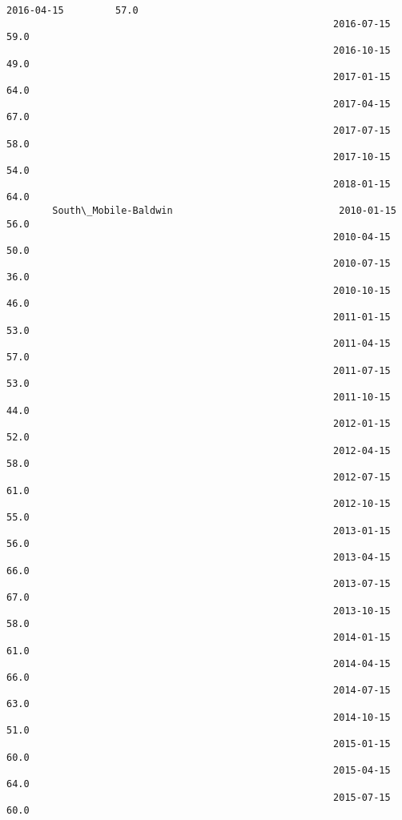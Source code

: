 \documentclass[11pt]{article}
\begin{document}
\begin{Verbatim}[commandchars=\\\{\}]
                                                         2016-04-15         57.0   
                                                         2016-07-15         59.0   
                                                         2016-10-15         49.0   
                                                         2017-01-15         64.0   
                                                         2017-04-15         67.0   
                                                         2017-07-15         58.0   
                                                         2017-10-15         54.0   
                                                         2018-01-15         64.0   
        South\_Mobile-Baldwin                             2010-01-15         56.0   
                                                         2010-04-15         50.0   
                                                         2010-07-15         36.0   
                                                         2010-10-15         46.0   
                                                         2011-01-15         53.0   
                                                         2011-04-15         57.0   
                                                         2011-07-15         53.0   
                                                         2011-10-15         44.0   
                                                         2012-01-15         52.0   
                                                         2012-04-15         58.0   
                                                         2012-07-15         61.0   
                                                         2012-10-15         55.0   
                                                         2013-01-15         56.0   
                                                         2013-04-15         66.0   
                                                         2013-07-15         67.0   
                                                         2013-10-15         58.0   
                                                         2014-01-15         61.0   
                                                         2014-04-15         66.0   
                                                         2014-07-15         63.0   
                                                         2014-10-15         51.0   
                                                         2015-01-15         60.0   
                                                         2015-04-15         64.0   
                                                         2015-07-15         60.0   

\end{Verbatim}
\end{document}
